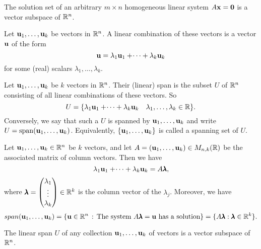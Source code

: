 \documentclass[10pt, a4paper]{article}
\begin{document}
\begin{proposition}
    The solution set of an arbitrary $m \times n$ homogeneous linear system $A\mathbf{x} = \mathbf{0}$ is a vector subspace of $\mathbb{R} ^ n$.
\end{proposition}

\begin{definition}
    Let $\mathbf{u}_1, \dotsc, \mathbf{u}_k$ be vectors in $\mathbb{R} ^ n$.
    A linear combination of these vectors is a vector $\mathbf{u}$ of the form
    \[
    \mathbf{u} = \lambda_1\mathbf{u}_1 + \dotsi + \lambda_k\mathbf{u}_k
    \]
    for some (real) scalars $\lambda_1, \dotsc, \lambda_k$. 
\end{definition}

\begin{definition}
    Let $\mathbf{u}_1, \dotsc, \mathbf{u}_k$ be $k$ vectors in $\mathbb{R} ^ n$.
    Their (linear) span is the subset $U$ of $\mathbb{R} ^ n$ consisting of all linear combinations of these vectors.
    So
    \[
    U = \{\lambda_1\mathbf{u}_1 + \dotsi + \lambda_k\mathbf{u}_k\quad\lambda_1, \dotsc, \lambda_k \in \mathbb{R}\}.
    \]
    Conversely,
    we say that such a $U$ is spanned by $\mathbf{u}_1, \dotsc, \mathbf{u}_k$ and write $U = \mathrm{span}(\mathbf{u}_1, \dotsc, \mathbf{u}_k)$.
    Equivalently,
    $\{\mathbf{u}_1, \dotsc, \mathbf{u}_k\}$ is called a spanning set of $U$.
\end{definition}

\begin{proposition}
    Let $\mathbf{u}_1, \dotsc, \mathbf{u}_k \in \mathbb{R} ^ n$ be $k$ vectors,
    and let $A = (\mathbf{u}_1, \dotsc, \mathbf{u}_k) \in M_{n, k}(\mathbb{R})$ be the associated matrix of column vectors.
    Then we have
    \[
    \lambda_1\mathbf{u}_1 + \dotsi + \lambda_k\mathbf{u}_k = A\pmb{\lambda},
    \]
    where $\pmb{\lambda} = \begin{pmatrix}
        \lambda_1 \\ \vdots \\ \lambda_k
    \end{pmatrix} \in \mathbb{R} ^ k$ is the column vector of the $\lambda_j$.
    Moreover,
    we have
    {
    \small
    \[
    span(\mathbf{u}_1, \dotsc, \mathbf{u}_k) = \{\mathbf{u} \in \mathbb{R} ^ n\,:\,\text{The system } A\pmb{\lambda} = \mathbf{u}\text{ has a solution}\} = \{A\pmb{\lambda}:\pmb{\lambda} \in \mathbb{R} ^ k\}.
    \]
    }
\end{proposition}

\begin{lemma}
    The linear span $U$ of any collection $\mathbf{u}_1, \dotsc, \mathbf{u}_k$ of vectors is a vector subspace of $\mathbb{R} ^ n$.
\end{lemma}
\end{document}
